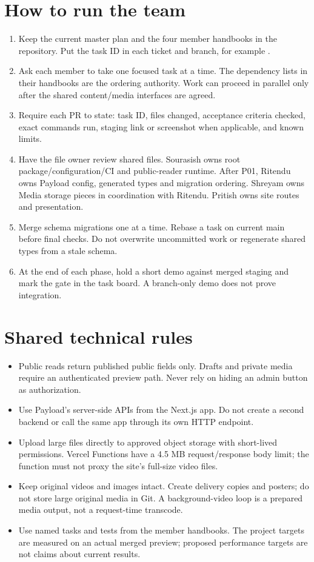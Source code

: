 \documentclass[11pt]{article}
\newcommand{\code}[1]{\path{#1}}
\begin{document}
\section{How to run the team}
\begin{enumerate}
\item Keep the current master plan and the four member handbooks in the repository. Put the task ID in each ticket and branch, for example \code{codex/m2-b03-projects}.
\item Ask each member to take one focused task at a time. The dependency lists in their handbooks are the ordering authority. Work can proceed in parallel only after the shared content/media interfaces are agreed.
\item Require each PR to state: task ID, files changed, acceptance criteria checked, exact commands run, staging link or screenshot when applicable, and known limits.
\item Have the file owner review shared files. Sourasish owns root package/configuration/CI and public-reader runtime. After P01, Ritendu owns Payload config, generated types and migration ordering. Shreyam owns Media storage pieces in coordination with Ritendu. Pritish owns site routes and presentation.
\item Merge schema migrations one at a time. Rebase a task on current main before final checks. Do not overwrite uncommitted work or regenerate shared types from a stale schema.
\item At the end of each phase, hold a short demo against merged staging and mark the gate in the task board. A branch-only demo does not prove integration.
\end{enumerate}

\section{Shared technical rules}
\begin{itemize}
\item Public reads return published public fields only. Drafts and private media require an authenticated preview path. Never rely on hiding an admin button as authorization.
\item Use Payload's server-side APIs from the Next.js app. Do not create a second backend or call the same app through its own HTTP endpoint.
\item Upload large files directly to approved object storage with short-lived permissions. Vercel Functions have a 4.5 MB request/response body limit; the function must not proxy the site's full-size video files.
\item Keep original videos and images intact. Create delivery copies and posters; do not store large original media in Git. A background-video loop is a prepared media output, not a request-time transcode.
\item Use named tasks and tests from the member handbooks. The project targets are measured on an actual merged preview; proposed performance targets are not claims about current results.
\end{itemize}
\end{document}
